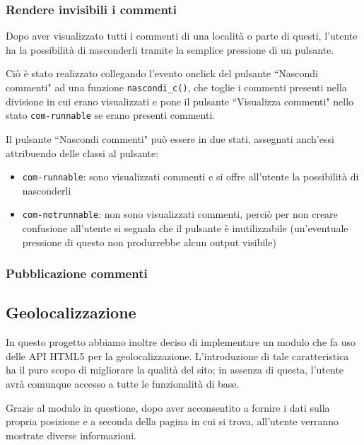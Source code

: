 \subsubsection{Rendere invisibili i commenti}
Dopo aver visualizzato tutti i commenti di una località o parte di questi,
l'utente ha la possibilità di nasconderli tramite la semplice pressione di un
pulsante.

Ciò è stato realizzato collegando l'evento onclick del pulsante
``Nascondi commenti" ad una funzione \texttt{nascondi\_c()}, che toglie i
commenti presenti nella divisione in cui erano visualizzati e pone il pulsante
``Visualizza commenti" nello stato \texttt{com-runnable} se erano presenti
commenti.

Il pulsante ``Nascondi commenti" può essere in due stati, assegnati anch'essi
attribuendo delle classi al pulsante:
\begin{itemize}
\item \texttt{com-runnable}: sono visualizzati commenti e si offre all'utente
la possibilità di nasconderli
\item \texttt{com-notrunnable}: non sono visualizzati commenti, perciò per non
creare confusione all'utente si segnala che il pulsante è inutilizzabile
(un'eventuale pressione di questo non produrrebbe alcun output visibile)
\end{itemize}


\subsubsection{Pubblicazione commenti} %

\subsection{Geolocalizzazione}
In questo progetto abbiamo inoltre deciso di implementare un modulo che fa uso
delle API HTML5 per la geolocalizzazione. L'introduzione di tale
caratteristica ha il puro scopo di migliorare la qualità del sito; in assenza
di questa, l'utente avrà comunque accesso a tutte le funzionalità di base.
\begin{flushleft}
Grazie al modulo in questione, dopo aver acconsentito a fornire i dati sulla
propria posizione e a seconda della pagina in cui si trova, all'utente
verranno mostrate diverse informazioni.
\end{flushleft}

